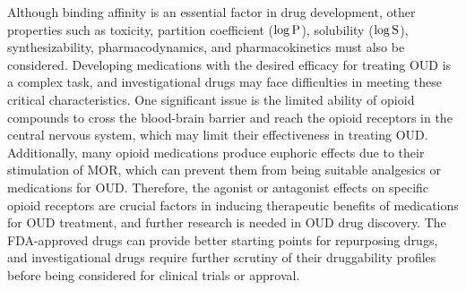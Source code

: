 \documentclass[10pt]{article}
\begin{document}
		Although binding affinity is an essential factor in drug development, other properties such as toxicity, partition coefficient ($\rm \log P$), solubility ($\rm \log S$), synthesizability, pharmacodynamics, and pharmacokinetics must also be considered. Developing medications with the desired efficacy for treating OUD is a complex task, and investigational drugs may face difficulties in meeting these critical characteristics. One significant issue is the limited ability of opioid compounds to cross the blood-brain barrier and reach the opioid receptors in the central nervous system, which may limit their effectiveness in treating OUD. Additionally, many opioid medications produce euphoric effects due to their stimulation of MOR, which can prevent them from being suitable analgesics or medications for OUD. Therefore, the agonist or antagonist effects on specific opioid receptors are crucial factors in inducing therapeutic benefits of medications for OUD treatment, and further research is needed in OUD drug discovery. The FDA-approved drugs can provide better starting points for repurposing drugs, and investigational drugs require further scrutiny of their druggability profiles before being considered for clinical trials or approval.
		
\end{document}
